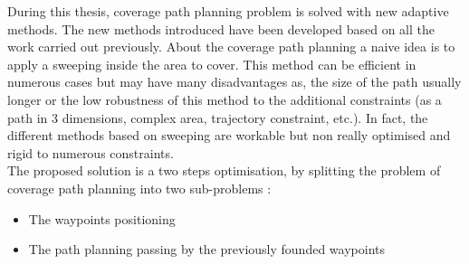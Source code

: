 During this thesis, coverage path planning problem is solved with new adaptive methods. The new methods introduced have been developed based on all the work carried out previously. 
About the coverage path planning a naive idea is to apply a sweeping inside the area to cover. This method can be efficient in numerous cases but may have many disadvantages as, the size of the path usually longer
or the low robustness of this method to the additional constraints (as a path in 3 dimensions, complex area, trajectory constraint, etc.). In fact, the different methods based on sweeping are workable but non really optimised and rigid to numerous constraints. \\
The proposed solution is a two steps optimisation, by splitting the problem of coverage path planning into two sub-problems : 
\begin{itemize}
\item The waypoints positioning 
\item The path planning passing by the previously founded waypoints
\end{itemize} 
